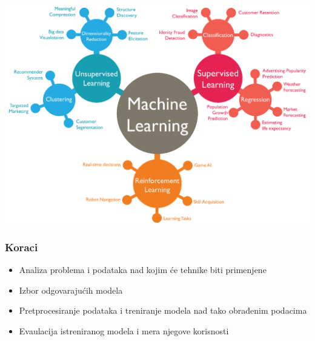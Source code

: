 \documentclass[11pt]{beamer}
\theoremstyle{definition}
\begin{document}
{
\begin{frame}{}
        \begin{center}
            \includegraphics[width=\textwidth,height=0.97\textheight,keepaspectratio]{machine-learning.png}
        \end{center}
    \end{frame}



\begin{frame}
\frametitle{Koraci}
\begin{itemize}
\item Analiza problema i podataka nad kojim će tehnike biti primenjene
\item Izbor odgovarajućih modela
\item Pretprocesiranje podataka i treniranje modela nad tako obrađenim podacima
\item Evaulacija istreniranog modela i mera njegove korisnosti
\end{itemize}
\end{frame}

}
\end{document}
